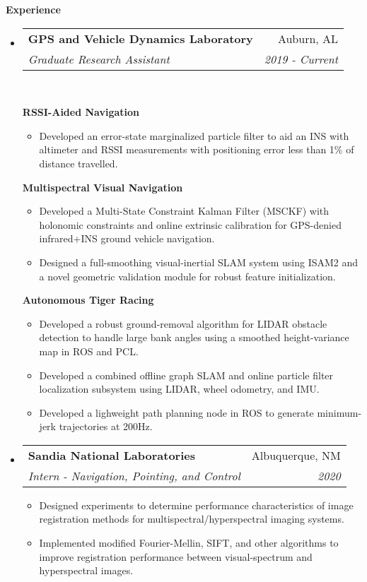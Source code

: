 \documentclass[letterpaper,11pt]{article}
\makeatletter
\newcommand{\resitem}[1]{\item #1 \vspace{-2pt}}
\newcommand{\resheading}[1]{\vspace{10pt} \Large \textbf{#1} \normalsize}
\newcommand{\ressubheading}[4]{
\begin{tabular*}{6.5in}{l@{\extracolsep{\fill}}r}
		\large \textbf{#1} \normalsize & #2 \\
		\textit{#3} & \textit{#4} \\
\end{tabular*}\vspace{-5pt}}
\makeatother
\begin{document}
\resheading{Experience}
\begin{itemize}

\item
	\ressubheading{GPS and Vehicle Dynamics Laboratory}{Auburn, AL}{Graduate Research Assistant}{2019 - Current}\\
	\vspace{10pt}

	\large \textbf{RSSI-Aided Navigation} \normalsize
	\vspace{-5pt}
	\begin{itemize}
		\resitem{Developed an error-state marginalized particle filter to aid an INS with altimeter and RSSI measurements with positioning error less than 1\% of distance travelled.}
	\end{itemize}

	\large \textbf{Multispectral Visual Navigation} \normalsize
	\vspace{-5pt}
	\begin{itemize}
		\resitem{Developed a Multi-State Constraint Kalman Filter (MSCKF) with holonomic constraints and online extrinsic calibration for GPS-denied infrared+INS ground vehicle navigation.}
		\resitem{Designed a full-smoothing visual-inertial SLAM system using ISAM2 and a novel geometric validation module for robust feature initialization.}
	\end{itemize}

	\large \textbf{Autonomous Tiger Racing} \normalsize
	\vspace{-5pt}
	\begin{itemize}
		\resitem{Developed a robust ground-removal algorithm for LIDAR obstacle detection to handle large bank angles using a smoothed height-variance map in ROS and PCL.}
		\resitem{Developed a combined offline graph SLAM and online particle filter localization subsystem using LIDAR, wheel odometry, and IMU.}
		\resitem{Developed a lighweight path planning node in ROS to generate minimum-jerk trajectories at 200Hz.}
	\end{itemize}

\item
	\ressubheading{Sandia National Laboratories}{Albuquerque, NM}{Intern - Navigation, Pointing, and Control}{2020}
	\begin{itemize}
		\item Designed experiments to determine performance characteristics of image registration methods for multispectral/hyperspectral imaging systems.
		\item Implemented modified Fourier-Mellin, SIFT, and other algorithms to improve registration performance between visual-spectrum and hyperspectral images.
	\end{itemize}

\end{itemize}
\end{document}
